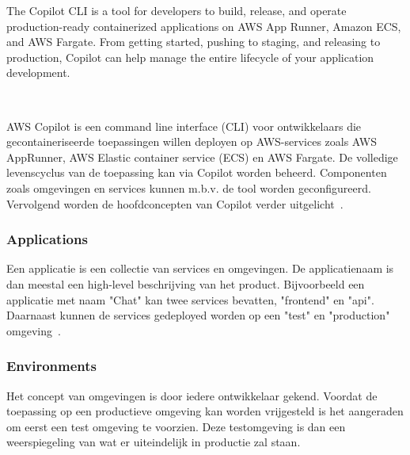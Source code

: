 
The Copilot CLI is a tool for developers to build, release, and operate production-ready containerized applications on AWS App Runner,
Amazon ECS, and AWS Fargate.
From getting started, pushing to staging, and releasing to production, Copilot can help manage the entire lifecycle of your application development.

~\autocite{Karakus2022}

AWS Copilot is een command line interface (CLI) voor ontwikkelaars die gecontaineriseerde toepassingen willen deployen op AWS-services zoals AWS AppRunner, AWS Elastic container service (ECS) en AWS Fargate.
De volledige levenscyclus van de toepassing kan via Copilot worden beheerd.
Componenten zoals omgevingen en services kunnen m.b.v. de tool worden geconfigureerd.
Vervolgend worden de hoofdconcepten van Copilot verder uitgelicht~\autocite{Karakus2022}.

\subsubsection{Applications}

Een applicatie is een collectie van services en omgevingen.
De applicatienaam is dan meestal een high-level beschrijving van het product.
Bijvoorbeeld een applicatie met naam "Chat" kan twee services bevatten, "frontend" en "api".
Daarnaast kunnen de services gedeployed worden op een "test" en "production" omgeving~\autocite{Karakus2022}.

\subsubsection{Environments}

Het concept van omgevingen is door iedere ontwikkelaar gekend.
Voordat de toepassing op een productieve omgeving kan worden vrijgesteld is het aangeraden om eerst een test omgeving te voorzien.
Deze testomgeving is dan een weerspiegeling van wat er uiteindelijk in productie zal staan.

